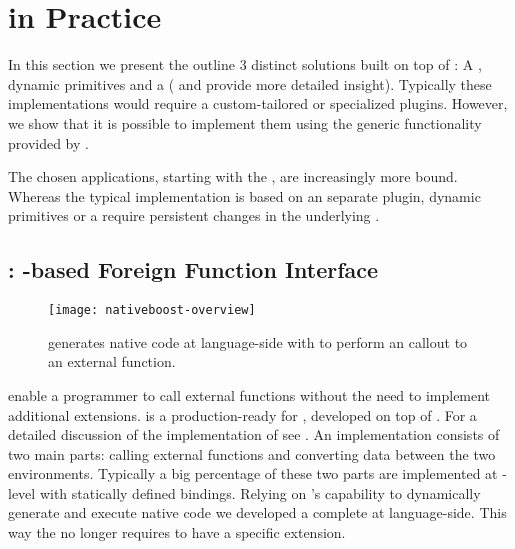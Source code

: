 \section{\B in Practice}
In this section we present the outline 3 distinct solutions built on top of \B: A \FFI, dynamic primitives and a \JIT ( and  provide more detailed insight).
Typically these implementations would require a custom-tailored \VM or specialized plugins.
However, we show that it is possible to implement them using the generic functionality provided by \B.

The chosen applications, starting with the \FFI, are increasingly more \VM bound.
Whereas the typical \FFI implementation is based on an separate plugin, dynamic primitives or a \JIT require persistent changes in the underlying \VM.


\subsection{\NB: \B-based Foreign Function Interface}

\begin{figure}[h]
	\centering
	\texttt{[image: nativeboost-overview]}
	\caption[\NB Overview]{\NB generates native code at language-side with \B to perform an \FFI callout to an external function.}
\end{figure}

\noindent \FFIs enable a programmer to call external functions without the need to implement additional \VM extensions.
\NB \cite{Brun13a} is a production-ready \FFI for \PH, developed on top of \B. 
For a detailed discussion of the implementation of \NB see .
An \FFI implementation consists of two main parts: calling external functions and converting data between the two environments.
Typically a big percentage of these two parts are implemented at \VM-level with statically defined bindings.
Relying on \B's capability to dynamically generate and execute native code we developed a complete \FFI at language-side.
This way the \VM no longer requires to have a specific \FFI extension.

